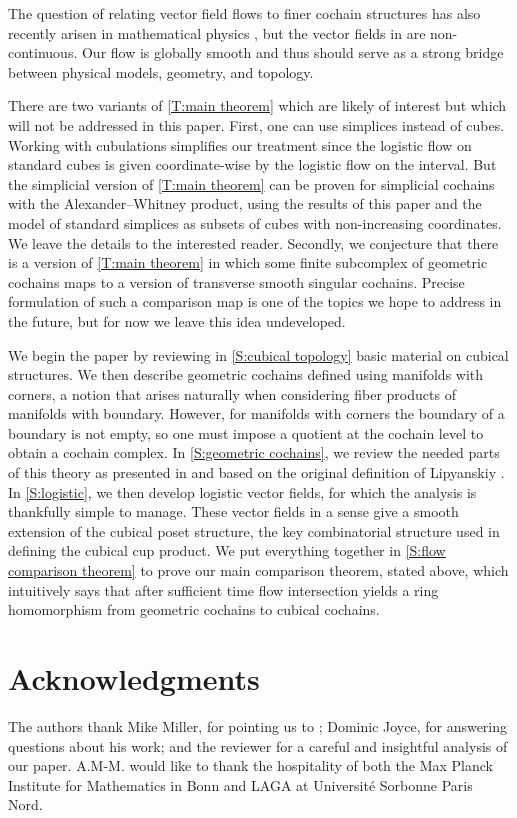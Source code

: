 The question of relating vector field flows to finer cochain structures has also recently arisen in mathematical physics \cite{Thor18, Tata20}, but the vector fields in \cite{Tata20} are non-continuous.
Our flow is globally smooth and thus should serve as a strong bridge between physical models, geometry, and topology.

There are two variants of \cref{T:main theorem} which are likely of interest but which will not be addressed in this paper.
First, one can use simplices instead of cubes.
Working with cubulations simplifies our treatment since the logistic flow on standard cubes is given coordinate-wise by the logistic flow on the interval.
But the simplicial version of \cref{T:main theorem} can be proven for simplicial cochains with the Alexander--Whitney product, using the results of this paper and the model of standard simplices as subsets of cubes with non-increasing coordinates.
We leave the details to the interested reader.
Secondly, we conjecture that there is a version of \cref{T:main theorem} in which some finite subcomplex of geometric cochains maps to a version of transverse smooth singular cochains.
Precise formulation of such a comparison map is one of the topics we hope to address in the future, but for now we leave this idea undeveloped.

We begin the paper by reviewing in \cref{S:cubical topology} basic material on cubical structures.
We then describe geometric cochains defined using manifolds with corners, a notion that arises naturally when considering fiber products of manifolds with boundary.
However, for manifolds with corners the boundary of a boundary is not empty, so one must impose a quotient at the cochain level to obtain a cochain complex.
In \cref{S:geometric cochains}, we review the needed parts of this theory as presented in \cite{medina2022foundations} and based on the original definition of Lipyanskiy \cite{Lipy14}.
In \cref{S:logistic}, we then develop logistic vector fields, for which the analysis is thankfully simple to manage.
These vector fields in a sense give a smooth extension of the cubical poset structure, the key combinatorial structure used in defining the cubical cup product.
We put everything together in \cref{S:flow comparison theorem} to prove our main comparison theorem, stated above, which intuitively says that after sufficient time flow intersection yields a ring homomorphism from geometric cochains to cubical cochains.

\section*{Acknowledgments}

The authors thank Mike Miller, for pointing us to \cite{Lipy14}; Dominic Joyce, for answering questions about his work; and the reviewer for a careful and insightful analysis of our paper.
A.M-M. would like to thank the hospitality of both the Max Planck Institute for Mathematics in Bonn and LAGA at Universit\'e Sorbonne Paris Nord.